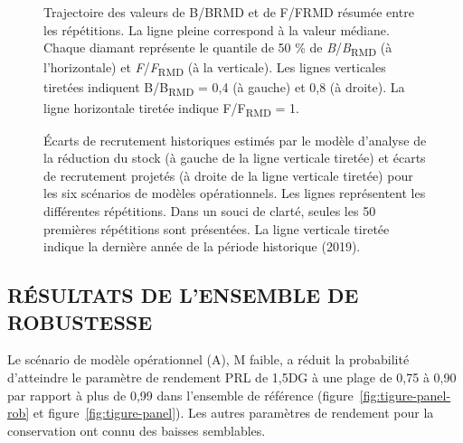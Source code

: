 \documentclass[french,11pt]{book}
\begin{document}
\begin{figure}[htb]

{\centering {} 

}

\caption{Trajectoire des valeurs de B/BRMD et de F/FRMD résumée entre les répétitions. La ligne pleine correspond à la valeur médiane. Chaque diamant représente le quantile de 50 \% de \emph{B}/\emph{B}\textsubscript{RMD} (à l'horizontale) et \emph{F}/\emph{F}\textsubscript{RMD} (à la verticale). Les lignes verticales tiretées indiquent B/B\textsubscript{RMD} = 0,4 (à gauche) et 0,8 (à droite). La ligne horizontale tiretée indique F/F\textsubscript{RMD} = 1.}\label{fig:worm}
\end{figure}
\clearpage


\begin{figure}[htb]

{\centering {} 

}

\caption{Écarts de recrutement historiques estimés par le modèle d'analyse de la réduction du stock (à gauche de la ligne verticale tiretée) et écarts de recrutement projetés (à droite de la ligne verticale tiretée) pour les six scénarios de modèles opérationnels. Les lignes représentent les différentes répétitions. Dans un souci de clarté, seules les 50 premières répétitions sont présentées. La ligne verticale tiretée indique la dernière année de la période historique (2019).}\label{fig:recdev-om-proj}
\end{figure}
\clearpage

\clearpage

\hypertarget{ruxe9sultats-de-lensemble-de-robustesse}{%
\subsection{RÉSULTATS DE L'ENSEMBLE DE ROBUSTESSE}\label{ruxe9sultats-de-lensemble-de-robustesse}}

Le scénario de modèle opérationnel (A), M faible, a réduit la probabilité d'atteindre le paramètre de rendement PRL de 1,5DG à une plage de 0,75 à 0,90 par rapport à plus de 0,99 dans l'ensemble de référence (figure~\ref{fig:tigure-panel-rob} et figure~\ref{fig:tigure-panel}). Les autres paramètres de rendement pour la conservation ont connu des baisses semblables.
\end{document}
